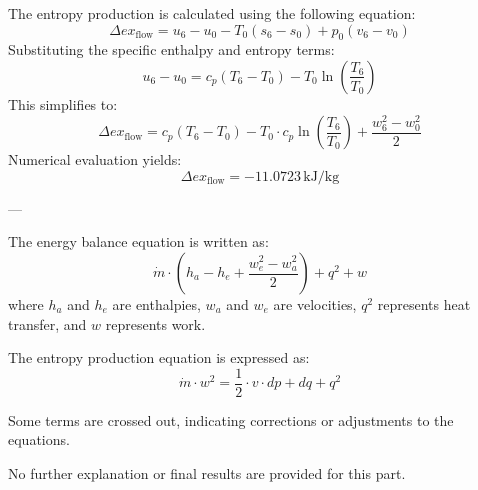 The entropy production is calculated using the following equation:  
\[
\Delta ex_{\text{flow}} = u_6 - u_0 - T_0(s_6 - s_0) + p_0(v_6 - v_0)
\]  
Substituting the specific enthalpy and entropy terms:  
\[
u_6 - u_0 = c_p(T_6 - T_0) - T_0 \ln \left(\frac{T_6}{T_0}\right)
\]  
This simplifies to:  
\[
\Delta ex_{\text{flow}} = c_p(T_6 - T_0) - T_0 \cdot c_p \ln \left(\frac{T_6}{T_0}\right) + \frac{w_6^2 - w_0^2}{2}
\]  
Numerical evaluation yields:  
\[
\Delta ex_{\text{flow}} = -11.0723 \, \text{kJ/kg}
\]  

---

The energy balance equation is written as:  
\[
\dot{m} \cdot \left( h_a - h_e + \frac{w_e^2 - w_a^2}{2} \right) + q^2 + w
\]  
where \( h_a \) and \( h_e \) are enthalpies, \( w_a \) and \( w_e \) are velocities, \( q^2 \) represents heat transfer, and \( w \) represents work.  

The entropy production equation is expressed as:  
\[
\dot{m} \cdot w^2 = \frac{1}{2} \cdot v \cdot dp + dq + q^2
\]  

Some terms are crossed out, indicating corrections or adjustments to the equations.  

No further explanation or final results are provided for this part.